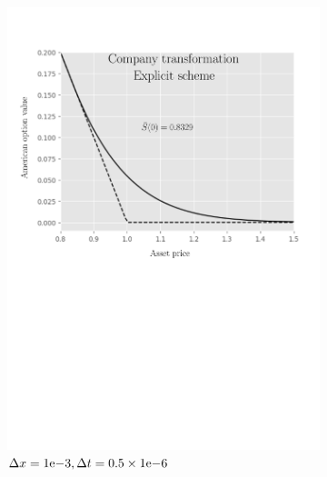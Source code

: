 \begin{figure}[H]
\begin{subfigure}{0.4\textwidth}
    \includegraphics[width=\textwidth]{chapters/chapter3/TestCase4ExplicitCompany.pdf}
    \caption{$\Delta{x}={1}\mathrm{e}{-3}, \Delta{t}=0.5\times{1}\mathrm{e}{-6}$}
    \label{fig:finitedifferencesschemes:numericaresults:test_case_4_explicit_company}
  \end{subfigure}
  \begin{subfigure}{0.4\textwidth}
    \centering

\end{subfigure}
\end{figure}

